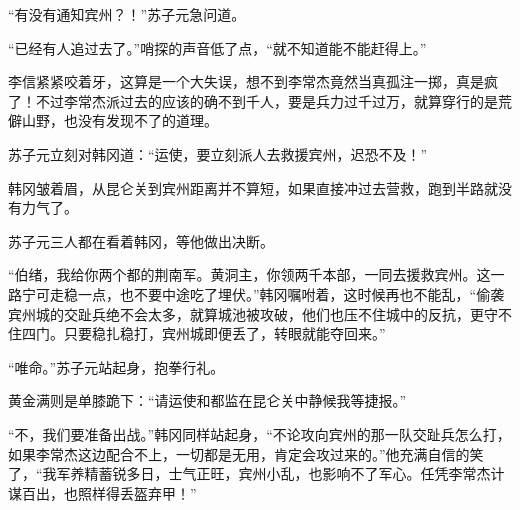 “有没有通知宾州？！”苏子元急问道。

“已经有人追过去了。”哨探的声音低了点，“就不知道能不能赶得上。”

李信紧紧咬着牙，这算是一个大失误，想不到李常杰竟然当真孤注一掷，真是疯了！不过李常杰派过去的应该的确不到千人，要是兵力过千过万，就算穿行的是荒僻山野，也没有发现不了的道理。

苏子元立刻对韩冈道：“运使，要立刻派人去救援宾州，迟恐不及！”

韩冈皱着眉，从昆仑关到宾州距离并不算短，如果直接冲过去营救，跑到半路就没有力气了。

苏子元三人都在看着韩冈，等他做出决断。

“伯绪，我给你两个都的荆南军。黄洞主，你领两千本部，一同去援救宾州。这一路宁可走稳一点，也不要中途吃了埋伏。”韩冈嘱咐着，这时候再也不能乱，“偷袭宾州城的交趾兵绝不会太多，就算城池被攻破，他们也压不住城中的反抗，更守不住四门。只要稳扎稳打，宾州城即便丢了，转眼就能夺回来。”

“唯命。”苏子元站起身，抱拳行礼。

黄金满则是单膝跪下：“请运使和都监在昆仑关中静候我等捷报。”

“不，我们要准备出战。”韩冈同样站起身，“不论攻向宾州的那一队交趾兵怎么打，如果李常杰这边配合不上，一切都是无用，肯定会攻过来的。”他充满自信的笑了，“我军养精蓄锐多日，士气正旺，宾州小乱，也影响不了军心。任凭李常杰计谋百出，也照样得丢盔弃甲！”


